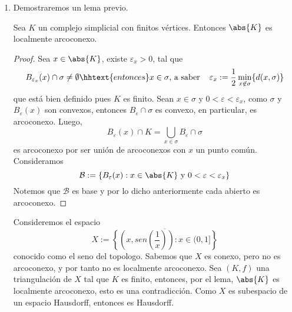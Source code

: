 \documentclass{article}
\begin{document}
\begin{enumerate}
    \item Demostraremos un lema previo.
    \begin{lema}
        Sea $K$ un complejo simplicial con finitos vértices. Entonces $\abs{K}$ es localmente 
        arcoconexo.
    \end{lema}
    \begin{proof}
        Sea $x\in\abs{K}$, existe $\varepsilon_{x}>0$, tal que
        \begin{equation*}
            B_{\varepsilon_{x}}(x)\cap\sigma\neq\emptyset\hhtext{entonces}x\in\sigma
            \text{, a saber}\hspace{4mm}\varepsilon_{x}:=\frac{1}{2}\min_{x\not\in\sigma}
            \{d(x,\sigma)\}
        \end{equation*}
        que está bien definido pues $K$ es finito. Sean $x\in\sigma$ y 
        $0<\varepsilon<\varepsilon_{x}$, como $\sigma$ y $B_{\varepsilon}(x)$ son convexos, 
        entonces $B_{\varepsilon}\cap\sigma$ es convexo, en particular, es arcoconexo. Luego,
        \begin{equation*}
            B_{\varepsilon}(x)\cap K=\bigcup_{x\in\sigma}B_{\varepsilon}\cap\sigma
        \end{equation*}
        es arcoconexo por ser unión de arcoconexos con $x$ un punto común. Consideramos
        \begin{equation*}
            \mathcal{B}:=\{B_{\varepsilon}(x):x\in\abs{K}\text{ y }0<\varepsilon<\varepsilon_{x}\}
        \end{equation*}
        Notemos que $\mathcal{B}$ es base y por lo dicho anteriormente cada abierto es arcoconexo.
    \end{proof}

    \noindent Consideremos el espacio
    \begin{equation*}
        X:=\overline{\left\{\left(x,sen\left(\frac{1}{x}\right)\right):x\in(0,1]\right\}}
    \end{equation*}
    conocido como el seno del topologo. Sabemos que $X$ es conexo, pero no es arcoconexo, y por 
    tanto no es localmente arcoconexo. Sea $(K,f)$ una triangulación de $X$ tal que $K$ es finito,
    entonces, por el lema, $\abs{K}$ es localmente arcoconexo, esto es una contradicción. Como $X$
    es subespacio de un espacio Hausdorff, entonces es Hausdorff.
\end{enumerate}

\newpage
\end{document}
